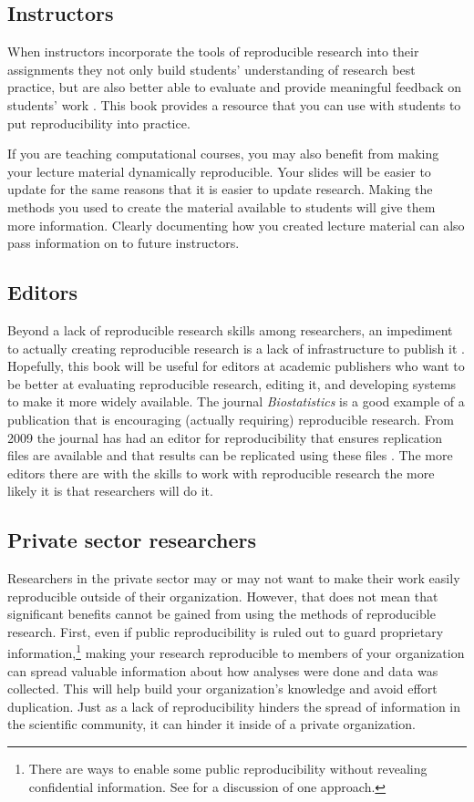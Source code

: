 \subsection{Instructors}
When instructors incorporate the tools of reproducible research into their assignments they not only build students' understanding of research best practice, but are also better able to evaluate and provide meaningful feedback on students' work \cite[183]{Ball2012}. This book provides a resource that you can use with students to put reproducibility into practice.

If you are teaching computational courses, you may also benefit from making your lecture material dynamically reproducible. Your slides will be easier to update for the same reasons that it is easier to update research.  Making the methods you used to create the material available to students will give them more information. Clearly documenting how you created lecture material can also pass information on to future instructors. 

\subsection{Editors}
Beyond a lack of reproducible research skills among researchers, an impediment to actually creating reproducible research is a lack of infrastructure to publish it \cite[]{Peng2011}. Hopefully, this book will be useful for editors at academic publishers who want to be better at evaluating reproducible research, editing it, and developing systems to make it more widely available. The journal {\emph{Biostatistics}} is a good example of a publication that is encouraging (actually requiring) reproducible research. From 2009 the journal  has had an editor for reproducibility that ensures replication files are available and that results can be replicated using these files \cite[]{Peng2009}. The more editors there are with the skills to work with reproducible research the more likely it is that researchers will do it.

\subsection{Private sector researchers}

Researchers in the private sector may or may not want to make their work easily reproducible outside of their organization. However, that does not mean that significant benefits cannot be gained from using the methods of reproducible research. First, even if public reproducibility is ruled out to guard proprietary information,\footnote{There are ways to enable some public reproducibility without revealing confidential information. See \cite{Vandewalle2007} for a discussion of one approach.} making your research reproducible to members of your organization can spread valuable information about how analyses were done and data was collected. This will help build your organization's knowledge and avoid effort duplication. Just as a lack of reproducibility hinders the spread of information in the scientific community, it can hinder it inside of a private organization. 

